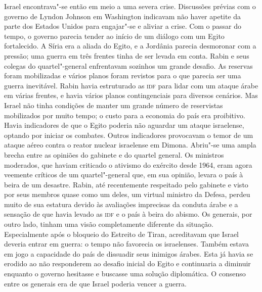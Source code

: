 Israel encontrava"-se então em meio a uma severa crise. Discussões
prévias com o governo de Lyndon Johnson em Washington indicavam não
haver apetite da parte dos Estados Unidos para engajar"-se e aliviar a crise. Com o
passar do tempo, o governo parecia tender ao início de um diálogo
com um Egito fortalecido. A Síria era a aliada do Egito, e a Jordânia
parecia desmoronar com a pressão; uma guerra em três frentes tinha de
ser levada em conta. Rabin e seus colegas do quartel"-general enfrentavam
sozinhos um grande desafio. As reservas foram mobilizadas e vários
planos foram revistos para o que parecia ser uma guerra inevitável.
Rabin havia estruturado as \textsc{idf} para lidar com um ataque árabe em várias
frentes, e havia vários planos contingenciais para diversos cenários. Mas
Israel não tinha condições de manter um grande número de reservistas
mobilizados por muito tempo; o custo para a economia do país era
proibitivo. Havia indicadores de que o Egito poderia não aguardar um
ataque israelense, optando por iniciar os combates. Outros indicadores
provocavam o temor de um ataque aéreo contra o reator nuclear israelense
em Dimona. Abriu"-se uma ampla brecha entre as opiniões do gabinete e do
quartel general. Os ministros moderados, que haviam criticado o ativismo
do exército desde 1964, eram agora veemente críticos de um quartel"-general
que, em sua opinião, levara o país à beira de um desastre. Rabin,
até recentemente respeitado pelo gabinete e visto por seus membros quase
como um deles, um virtual ministro da Defesa, perdeu muito de sua
estatura devido às avaliações imprecisas da conduta árabe e a sensação
de que havia levado as \textsc{idf} e o país à beira do abismo. Os generais, por
outro lado, tinham uma visão completamente diferente da situação.
Especialmente após o bloqueio do Estreito de Tiran, acreditavam que Israel
deveria entrar em guerra: o tempo não favorecia os israelenses. Também
estava em jogo a capacidade do país de dissuadir seus inimigos árabes.
Esta já havia se erodido ao não responderem ao desafio inicial do Egito
e continuaria a diminuir enquanto o governo hesitasse e buscasse uma
solução diplomática. O consenso entre os generais era de que Israel
poderia vencer a guerra.

